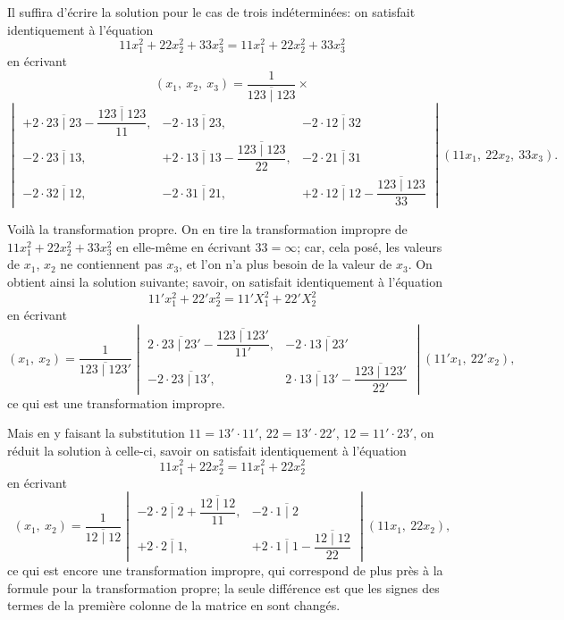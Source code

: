 \documentclass[11pt,a4paper]{book}
\begin{document}
Il suffira d'\'{e}crire la solution pour le cas de trois ind\'{e}termin\'{e}es: on satisfait identiquement \`{a} l'\'{e}quation
\[
11 x_1^2 + 22 x_2^2 + 33 x_3^2 = 11 x_1^2 + 22 x_2^2 + 33 x_3^2
\]
en \'{e}crivant
\[
(x_1,\ x_2,\ x_3) = \frac{1}{\overline{123 \mid 123}} \times
\]
\[
\begin{vmatrix}
+2 \cdot \overline{23 \mid 23} - \dfrac{\overline{123 \mid 123}}{11}, &
-2 \cdot \overline{13 \mid 23}, &
-2 \cdot \overline{12 \mid 32} \\[1.5em]
-2 \cdot \overline{23 \mid 13}, &
+2 \cdot \overline{13 \mid 13} - \dfrac{\overline{123 \mid 123}}{22}, &
-2 \cdot \overline{21 \mid 31} \\[1.5em]
-2 \cdot \overline{32 \mid 12}, &
-2 \cdot \overline{31 \mid 21}, &
+2 \cdot \overline{12 \mid 12} - \dfrac{\overline{123 \mid 123}}{33}
\end{vmatrix}
(11x_1,\ 22x_2,\ 33x_3).
\]

\newpage
\setcounter{page}{210}

Voil\`{a} la transformation propre. On en tire la transformation impropre de $11x_1^2 + 22x_2^2 + 33x_3^2$ en elle-m\^{e}me en \'{e}crivant $33 = \infty$; car, cela pos\'{e}, les valeurs de $x_1$, $x_2$ ne contiennent pas $x_3$, et l'on n'a plus besoin de la valeur de $x_3$. On obtient ainsi la solution suivante; savoir, on satisfait identiquement \`{a} l'\'{e}quation
\[
11' x_1^2 + 22' x_2^2 = 11' X_1^2 + 22' X_2^2
\]
en \'{e}crivant
\[
(x_1,\ x_2) =
\frac{1}{\overline{123 \mid 123'}}
\begin{vmatrix}
2 \cdot \overline{23 \mid 23'} - \dfrac{\overline{123 \mid 123'}}{11'}, &
-2 \cdot \overline{13 \mid 23'} \\[1em]
-2 \cdot \overline{23 \mid 13'}, &
2 \cdot \overline{13 \mid 13'} - \dfrac{\overline{123 \mid 123'}}{22'}
\end{vmatrix}
(11' x_1,\ 22' x_2),
\]
ce qui est une transformation impropre.

Mais en y faisant la substitution $11 = 13' \cdot 11'$, $22 = 13' \cdot 22'$, $12 = 11' \cdot 23'$, on r\'{e}duit la solution \`{a} celle-ci, savoir on satisfait identiquement \`{a} l'\'{e}quation
\[
11 x_1^2 + 22 x_2^2 = 11 x_1^2 + 22 x_2^2
\]
en \'{e}crivant
\[
(x_1,\ x_2) =
\frac{1}{\overline{12 \mid 12}}
\begin{vmatrix}
-2 \cdot \overline{2 \mid 2} + \dfrac{\overline{12 \mid 12}}{11}, &
-2 \cdot \overline{1 \mid 2} \\[1em]
+2 \cdot \overline{2 \mid 1}, &
+2 \cdot \overline{1 \mid 1} - \dfrac{\overline{12 \mid 12}}{22}
\end{vmatrix}
(11 x_1,\ 22 x_2),
\]
ce qui est encore une transformation impropre, qui correspond de plus pr\`{e}s \`{a} la formule pour la transformation propre; la seule diff\'{e}rence est que les signes des termes de la premi\`{e}re colonne de la matrice en sont chang\'{e}s.
\end{document}
